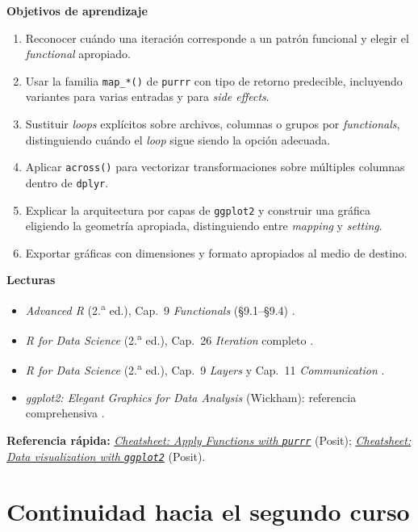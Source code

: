 \documentclass[11pt,letterpaper]{article}
\newcommand{\cheatsheet}[2]{%
  \href{https://rstudio.github.io/cheatsheets/#1.pdf}{\textit{Cheatsheet: #2}}%
}
\begin{document}
\medskip
\noindent\textbf{Objetivos de aprendizaje}
\begin{enumerate}[leftmargin=*, itemsep=1pt]
    \item Reconocer cuándo una iteración corresponde a un patrón funcional y elegir el \textit{functional} apropiado.
    \item Usar la familia \texttt{map\_*()} de \texttt{purrr} con tipo de retorno predecible, incluyendo variantes para varias entradas y para \textit{side effects}.
    \item Sustituir \textit{loops} explícitos sobre archivos, columnas o grupos por \textit{functionals}, distinguiendo cuándo el \textit{loop} sigue siendo la opción adecuada.
    \item Aplicar \texttt{across()} para vectorizar transformaciones sobre múltiples columnas dentro de \texttt{dplyr}.
    \item Explicar la arquitectura por capas de \texttt{ggplot2} y construir una gráfica eligiendo la geometría apropiada, distinguiendo entre \textit{mapping} y \textit{setting}.
    \item Exportar gráficas con dimensiones y formato apropiados al medio de destino.
\end{enumerate}

\medskip
\noindent\textbf{Lecturas}
\begin{itemize}[leftmargin=*, itemsep=1pt]
    \item \textit{Advanced R} (2.\textsuperscript{a} ed.), Cap.\ 9 \textit{Functionals} (§9.1--§9.4) \cite{wickham2019advr}.
    \item \textit{R for Data Science} (2.\textsuperscript{a} ed.), Cap.\ 26 \textit{Iteration} completo \cite{wickham2023r4ds}.
    \item \textit{R for Data Science} (2.\textsuperscript{a} ed.), Cap.\ 9 \textit{Layers} y Cap.\ 11 \textit{Communication} \cite{wickham2023r4ds}.
    \item \textit{ggplot2: Elegant Graphics for Data Analysis} (Wickham): referencia comprehensiva \cite{wickham2016ggplot2}.
\end{itemize}

\medskip
\noindent\textbf{Referencia rápida:} \cheatsheet{purrr}{Apply Functions with \texttt{purrr}} (Posit); \cheatsheet{data-visualization}{Data visualization with \texttt{ggplot2}} (Posit).

\section{Continuidad hacia el segundo curso}
\end{document}
